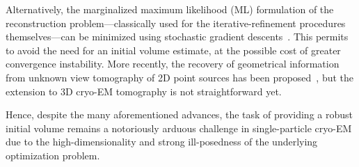 Alternatively, the  marginalized maximum likelihood (ML) formulation of the reconstruction problem---classically used for the iterative-refinement procedures themselves---can be minimized using stochastic gradient descents~\cite{punjani2017cryosparc}. This permits to avoid the need for an initial volume estimate, at the possible cost of greater convergence instability. More recently, the recovery of geometrical information from unknown view tomography of 2D point sources has been proposed~\cite{zehni2019distance}, but the extension to 3D cryo-EM tomography is not straightforward yet.

Hence, despite the many aforementioned advances, the task of providing a robust initial volume remains a notoriously arduous challenge in single-particle cryo-EM due to the high-dimensionality and strong ill-posedness of the underlying optimization problem.

